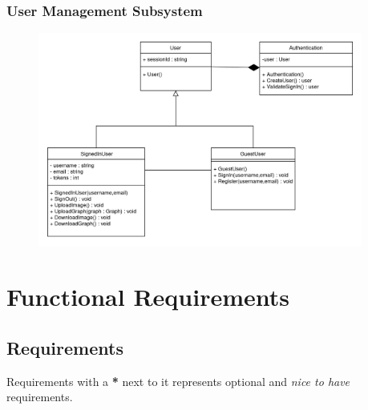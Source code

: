 \documentclass[11pt,a4paper]{article}
\begin{document}
\subsubsection*{User Management Subsystem}
\begin{figure}[htbp]
    \centering
    \href{https://drive.google.com/drive/u/2/folders/1rnYMSGTOmKY8_pOyJUIacjTxuubO_6NX}
    {\includegraphics[width=0.95\textwidth]{../diagramPng/User-Subsystem.png}}
\end{figure}

\pagebreak

\section*{Functional Requirements}

\subsection*{Requirements}

Requirements with a \textbf{*} next to it represents optional and \textit{nice
to have} requirements.
\end{document}
